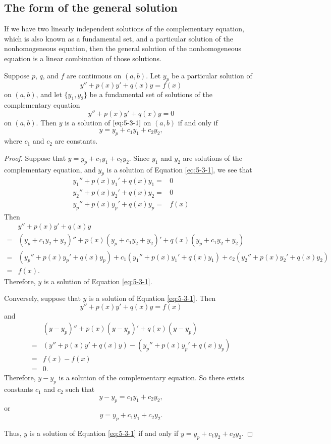\subsection{The form of the general solution}

If we have two linearly independent solutions of the complementary equation, which is also known as a fundamental set, and a particular solution of the nonhomogeneous equation, then the general solution of the nonhomogeneous equation is a linear combination of those solutions.

\begin{theorem}\label{thm:generalsol2ndlinear}
  Suppose $p$, $q$, and $f$ are continuous on $(a,b)$. Let $y_p$ be a particular solution of
\begin{equation}
  y''+p(x)y'+q(x)y=f(x)\label{eq:5-3-1}
\end{equation}
on $(a,b)$, and let $\{y_1,y_2\}$ be a fundamental set of solutions of the complementary equation
\[y''+p(x)y'+q(x)y=0\]
on $(a,b)$. Then $y$ is a solution of $\eqref{eq:5-3-1}$ on $(a,b)$ if and only if
\[y=y_p+c_1y_1+c_2y_2,\]
where $c_1$ and $c_2$ are constants.
\end{theorem}
\begin{proof}
  Suppose that $y=y_p+c_1y_1+c_2y_2$.
Since $y_1$ and $y_2$ are solutions of the complementary equation, and $y_p$ is a solution of Equation \eqref{eq:5-3-1}, we see that
\[
\begin{aligned}
  y_1''+p(x)y_1'+q(x)y_1=&0\\
  y_2''+p(x)y_2'+q(x)y_2=&0\\
  y_p''+p(x)y_p'+q(x)y_p=&f(x)
\end{aligned}  
\]
Then
\[
\begin{aligned}
  &y''+p(x)y'+q(x)y\\
  =&(y_p+c_1y_2+y_2)''+p(x)(y_p+c_1y_2+y_2)'+q(x)(y_p+c_1y_2+y_2)\\
  =&(y_p''+p(x)y_p'+q(x)y_p) + c_1(y_1''+p(x)y_1'+q(x)y_1) + c_2(y_2''+p(x)y_2'+q(x)y_2)\\
  =&f(x).
\end{aligned}
\]
Therefore, $y$ is a solution of Equation \eqref{eq:5-3-1}.

Conversely, suppose that $y$ is a solution of Equation \eqref{eq:5-3-1}. Then
\[y''+p(x)y'+q(x)y=f(x)\]
and 
\[
\begin{aligned}
 &(y-y_p)''+p(x)(y-y_p)'+q(x)(y-y_p)\\
  =&(y''+p(x)y'+q(x)y)-(y_p''+p(x)y_p'+q(x)y_p)\\
  =&f(x)-f(x)\\
  =&0.
\end{aligned}
\]
Therefore, $y-y_p$ is a solution of the complementary equation. So there exists constants $c_1$ and $c_2$ such that
\[y-y_p=c_1y_1+c_2y_2,\]
or
\[y=y_p+c_1y_1+c_2y_2.\]

Thus, $y$ is a solution of Equation \eqref{eq:5-3-1} if and only if $y=y_p+c_1y_2+c_2y_2$.
\end{proof}


